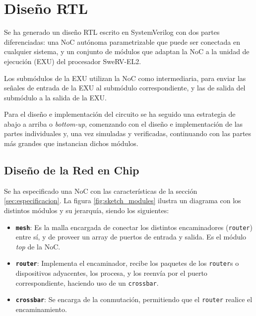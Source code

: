 \chapter{Diseño RTL}

\newcommand{\textmodule}[1]{\texttt{#1}}

Se ha generado un diseño RTL escrito en SystemVerilog con dos partes diferenciadas: una NoC autónoma parametrizable que puede ser conectada en cualquier sistema, y un conjunto de módulos que adaptan la NoC a la unidad de ejecución (EXU) del procesador SweRV-EL2.

Los submódulos de la EXU utilizan la NoC como intermediaria, para enviar las señales de entrada de la EXU al submódulo correspondiente, y las de salida del submódulo a la salida de la EXU.

Para el diseño e implementación del circuito se ha seguido una estrategia de abajo a arriba o \textit{bottom-up}, comenzando con el diseño e implementación de las partes individuales y, una vez simuladas y verificadas, continuando con las partes más grandes que instancian dichos módulos.

\section{Diseño de la Red en Chip}

Se ha especificado una NoC con las características de la sección \ref{sec:especificacion}. La figura \ref{fig:sketch_modules} ilustra un diagrama con los distintos módulos y su jerarquía, siendo los siguientes:
\begin{itemize}[noitemsep]
    \item \textbf{\textmodule{mesh}}: Es la malla encargada de conectar los distintos encaminadores (\textmodule{router}) entre sí, y de proveer un array de puertos de entrada y salida. Es el módulo \textit{top} de la NoC.
    \item \textbf{\textmodule{router}}: Implementa el encaminador, recibe los paquetes de los \textmodule{router}s o dispositivos adyacentes, los procesa, y los reenvía por el puerto correspondiente, haciendo uso de un \textmodule{crossbar}.
    \item \textbf{\textmodule{crossbar}}: Se encarga de la conmutación, permitiendo que el \textmodule{router} realice el encaminamiento.
\end{itemize}

